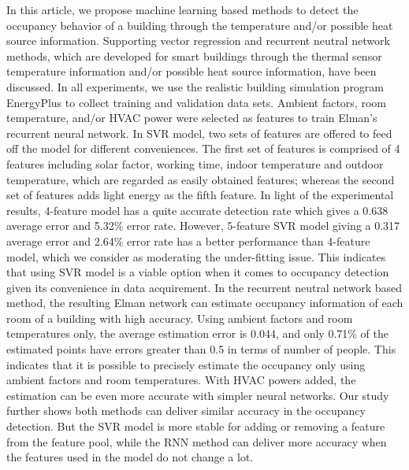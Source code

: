 \documentclass[acmtodaes,notfinal]{acmtrans2m}
\begin{document}
In this article, we propose machine learning based methods to
detect the occupancy behavior of a building through the temperature
and/or possible heat source information. Supporting vector regression and recurrent neutral
network methods, which are developed for smart buildings through the thermal sensor
temperature information and/or possible heat source information, have
been discussed. In all experiments, we use the realistic building
simulation program EnergyPlus to collect training and validation
data sets. Ambient factors, room temperature, and/or HVAC power were
selected as features to train Elman's recurrent neural network.
In SVR model, two sets of features are offered to feed off the
model for different conveniences. The first set of features is
comprised of 4 features including solar factor, working time, indoor
temperature and outdoor temperature, which are regarded as easily
obtained features; whereas the second set of features adds light
energy as the fifth feature. In light of the experimental results,
4-feature model has a quite accurate detection rate which gives a
0.638 average error and 5.32\% error rate. However, 5-feature SVR
model giving a 0.317 average error and 2.64\% error rate has a better
performance than 4-feature model, which we consider as moderating the
under-fitting issue. This indicates that using SVR model is a viable
option when it comes to occupancy detection given its convenience in
data acquirement. In the recurrent neutral network based method, the
resulting Elman network can estimate occupancy information of each
room of a building with high accuracy. Using ambient factors and room
temperatures only, the average estimation error is 0.044, and only
0.71\% of the estimated points have errors greater than 0.5 in terms
of number of people. This indicates that it is possible to precisely
estimate the occupancy only using ambient factors and room
temperatures. With HVAC powers added, the estimation can be even more
accurate with simpler neural networks.  Our study further shows
both methods can deliver similar accuracy in the occupancy detection.
But the SVR model is more stable for adding or removing a feature
from the feature pool, while the RNN method can deliver more accuracy when the features used
in the model do not change a lot.


%
%

\end{document}
